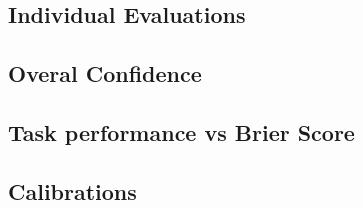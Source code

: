 \documentclass[../main/main.tex]{subfiles}
\begin{document}
\subsection{Individual Evaluations}
\subsection{Overal Confidence}
\subsection{Task performance vs Brier Score}
\subsection{Calibrations}
\end{document}

